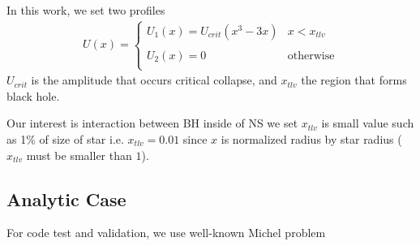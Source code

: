 \documentclass[prd]{revtex4}
\begin{document}
In this work, we set two profiles
\begin{align}
U(x) =
\begin{cases}
U_1(x) = U_{crit} ( x^3 - 3x) & x < x_{tlv} \\
\\
U_2(x) = 0 & \textrm{otherwise} \\
\end{cases}
\end{align}
$U_{crit}$ is the amplitude that occurs critical collapse, and $x_{tlv}$ the region that forms black hole. 

Our interest is interaction between BH inside of NS we set $x_{tlv}$ is small value such as 1\% of size of star i.e. $x_{tlv} = 0.01$ since $x$ is normalized radius by star radius ($x_{tlv}$ must be smaller than $1$).

\subsection{Analytic Case}

For code test and validation, we use well-known Michel problem
\end{document}
